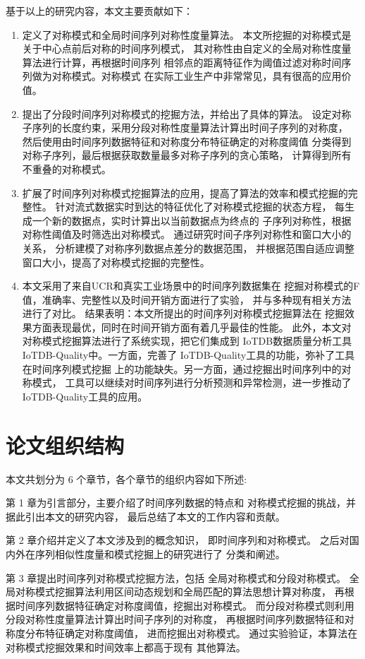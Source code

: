 基于以上的研究内容，本文主要贡献如下：
\begin{enumerate}
\item 定义了对称模式和全局时间序列对称性度量算法。
本文所挖掘的对称模式是关于中心点前后对称的时间序列模式，
其对称性由自定义的全局对称性度量算法进行计算，再根据时间序列
相邻点的距离特征作为阈值过滤对称时间序列做为对称模式。对称模式
在实际工业生产中非常常见，具有很高的应用价值。
\item 提出了分段时间序列对称模式的挖掘方法，并给出了具体的算法。
设定对称子序列的长度约束，采用分段对称性度量算法计算出时间子序列的对称度，
然后使用由时间序列数据特征和对称度分布特征确定的对称度阈值
分类得到对称子序列，最后根据获取数量最多对称子序列的贪心策略，
计算得到所有不重叠的对称模式。
\item 扩展了时间序列对称模式挖掘算法的应用，提高了算法的效率和模式挖掘的完整性。
针对流式数据实时到达的特征优化了对称模式挖掘的状态方程，
每生成一个新的数据点，实时计算出以当前数据点为终点的
子序列对称性，根据对称性阈值及时筛选出对称模式。
通过研究时间子序列对称性和窗口大小的关系，
分析建模了对称序列数据点差分的数据范围，
并根据范围自适应调整窗口大小，提高了对称模式挖掘的完整性。
\item 本文采用了来自UCR和真实工业场景中的时间序列数据集在
挖掘对称模式的F值，准确率、完整性以及时间开销方面进行了实验，
并与多种现有相关方法进行了对比。
结果表明：本文所提出的时间序列对称模式挖掘算法在
挖掘效果方面表现最优，同时在时间开销方面有着几乎最佳的性能。
此外，本文对对称模式挖掘算法进行了系统实现，把它们集成到
IoTDB数据质量分析工具IoTDB-Quality中。一方面，完善了
IoTDB-Quality工具的功能，弥补了工具在时间序列模式挖掘
上的功能缺失。另一方面，通过挖掘出时间序列中的对称模式，
工具可以继续对时间序列进行分析预测和异常检测，进一步推动了
IoTDB-Quality工具的应用。
\end{enumerate}

\section{论文组织结构}

本文共划分为 6 个章节，各个章节的组织内容如下所述:

第 1 章为引言部分，主要介绍了时间序列数据的特点和
对称模式挖掘的挑战，并据此引出本文的研究内容，
最后总结了本文的工作内容和贡献。

第 2 章介绍并定义了本文涉及到的概念知识，
即时间序列和对称模式。
之后对国内外在序列相似性度量和模式挖掘上的研究进行了
分类和阐述。

第 3 章提出时间序列对称模式挖掘方法，包括
全局对称模式和分段对称模式。
全局对称模式挖掘算法利用区间动态规划和全局匹配的算法思想计算对称度，
再根据时间序列数据特征确定对称度阈值，挖掘出对称模式。
而分段对称模式则利用分段对称性度量算法计算出时间子序列的对称度，
再根据时间序列数据特征和对称度分布特征确定对称度阈值，
进而挖掘出对称模式。
通过实验验证，本算法在对称模式挖掘效果和时间效率上都高于现有
其他算法。

